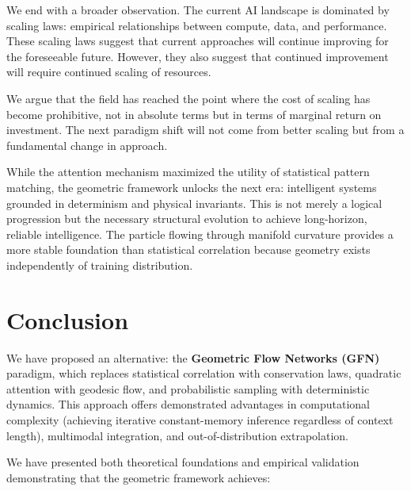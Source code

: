 \documentclass[12pt,a4paper]{article}
\begin{document}
We end with a broader observation. The current AI landscape is dominated by scaling laws: empirical relationships between compute, data, and performance. These scaling laws suggest that current approaches will continue improving for the foreseeable future. However, they also suggest that continued improvement will require continued scaling of resources.

We argue that the field has reached the point where the cost of scaling has become prohibitive, not in absolute terms but in terms of marginal return on investment. The next paradigm shift will not come from better scaling but from a fundamental change in approach.

While the attention mechanism maximized the utility of statistical pattern matching, the geometric framework unlocks the next era: intelligent systems grounded in determinism and physical invariants. This is not merely a logical progression but the necessary structural evolution to achieve long-horizon, reliable intelligence. The particle flowing through manifold curvature provides a more stable foundation than statistical correlation because geometry exists independently of training distribution.

\section{Conclusion}
\label{sec:conclusion}

We have proposed an alternative: the \textbf{Geometric Flow Networks (GFN)} paradigm, which replaces statistical correlation with conservation laws, quadratic attention with geodesic flow, and probabilistic sampling with deterministic dynamics. This approach offers demonstrated advantages in computational complexity (achieving iterative constant-memory inference regardless of context length), multimodal integration, and out-of-distribution extrapolation.

We have presented both theoretical foundations and empirical validation demonstrating that the geometric framework achieves:
\end{document}
